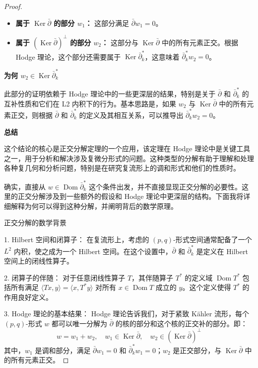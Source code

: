 \documentclass[lang=cn,zihao=-4,a4paper,fontset=none]{beautybook}
\begin{document}
\begin{proof}
\begin{itemize}
    \item \textbf{属于 $\operatorname{Ker} \bar{\partial}$ 的部分 $w_1$：}
    这部分满足 $\bar{\partial} w_1 = 0$。
    
    \item \textbf{属于 $(\operatorname{Ker} \bar{\partial})^\perp$ 的部分 $w_2$：}
    这部分与 $\operatorname{Ker} \bar{\partial}$ 中的所有元素正交。根据 Hodge 理论，这个部分还需要属于 $\operatorname{Ker} \bar{\partial}_k^*$，这意味着 $\bar{\partial}_k^* w_2 = 0$。
\end{itemize}

\textbf{为何 $w_2 \in \operatorname{Ker} \bar{\partial}_k^*$}

此部分的证明依赖于 Hodge 理论中的一些更深层的结果，特别是关于 $\bar{\partial}$ 和 $\bar{\partial}_k^*$ 的互补性质和它们在 L2 内积下的行为。基本思路是，如果 $w_2$ 与 $\operatorname{Ker} \bar{\partial}$ 中的所有元素正交，则根据 $\bar{\partial}$ 和 $\bar{\partial}_k^*$ 的定义及其相互关系，可以推导出 $\bar{\partial}_k^* w_2 = 0$。

\textbf{总结}

这个结论的核心是正交分解定理的一个应用，该定理在 Hodge 理论中是关键工具之一，用于分析和解决涉及复微分形式的问题。这种类型的分解有助于理解和处理各种复几何和分析问题，特别是在研究复流形上的调和形式和他们的性质时。

确实，直接从 $w \in \operatorname{Dom} \bar{\partial}_k^*$ 这个条件出发，并不直接显现正交分解的必要性。这里的正交分解涉及到一些额外的假设和 Hodge 理论中更深层的结构。下面我将详细解释为何可以得到这种分解，并阐明背后的数学原理。

正交分解的数学背景

1. Hilbert 空间和闭算子：
   在复流形上，考虑的 $(p, q)$-形式空间通常配备了一个 $L^2$ 内积，使之成为一个 Hilbert 空间。在这个设置中，$\bar{\partial}$ 和 $\bar{\partial}_k^*$ 是定义在 Hilbert 空间上的闭线性算子。

2. 闭算子的伴随：
   对于任意闭线性算子 $T$，其伴随算子 $T^*$ 的定义域 $\operatorname{Dom} T^*$ 包括所有满足 $\langle Tx, y \rangle = \langle x, T^* y \rangle$ 对所有 $x \in \operatorname{Dom} T$ 成立的 $y$。这个定义使得 $T^*$ 的作用良好定义。

3. Hodge 理论的基本结果：
   Hodge 理论告诉我们，对于紧致 Kähler 流形，每个 $(p, q)$-形式 $w$ 都可以唯一分解为 $\bar{\partial}$ 的核的部分和这个核的正交补的部分。即：
   $$
   w = w_1 + w_2, \quad w_1 \in \operatorname{Ker} \bar{\partial}, \quad w_2 \in (\operatorname{Ker} \bar{\partial})^\perp
   $$
   其中，$w_1$ 是调和部分，满足 $\bar{\partial} w_1 = 0$ 和 $\bar{\partial}_k^* w_1 = 0$；$w_2$ 是正交部分，与 $\operatorname{Ker} \bar{\partial}$ 中的所有元素正交。


\end{proof}
\end{document}

